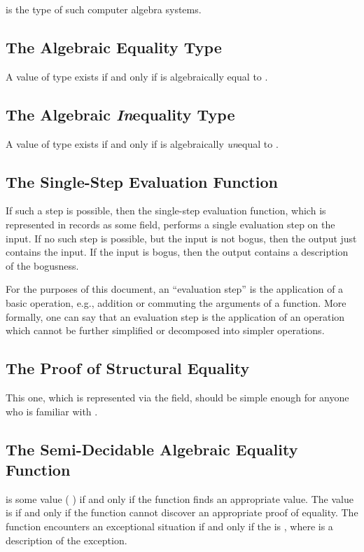 \documentclass{report}
\begin{document}
 is the type of such computer algebra systems.

\subsection{The Algebraic Equality Type}
A value of type     exists if and only if  is algebraically equal to .

\subsection{The Algebraic \emph{In}equality Type}
A value of type     exists if and only if  is algebraically \emph{un}equal to .

\subsection{The Single-Step Evaluation Function}
If such a step is possible, then the single-step evaluation function, which is represented in  records as some  field, performs a single evaluation step on the input.  If no such step is possible, but the input is not bogus, then the output just contains the input.  If the input is bogus, then the output contains a description of the bogusness.

For the purposes of this document, an ``evaluation step'' is the application of a basic operation, e.g., addition or commuting the arguments of a function.  More formally, one can say that an evaluation step is the application of an operation which cannot be further simplified or decomposed into simpler operations.

\subsection{The Proof of Structural Equality}
This one, which is represented via the  field, should be simple enough for anyone who is familiar with .

\subsection{The Semi-Decidable Algebraic Equality Function}
    is some value  \AgdaSymbol( \AgdaSymbol) if and only if the  function finds an appropriate value.  The  value is   if and only if the function cannot discover an appropriate proof of equality.  The function encounters an exceptional situation if and only if the  is  , where  is a description of the exception.
\end{document}
